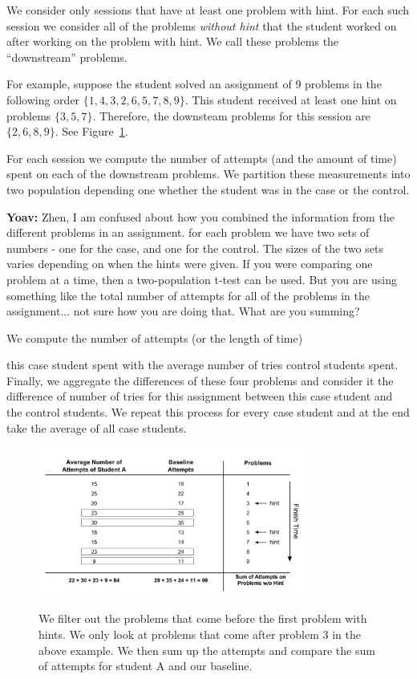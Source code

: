 \documentclass{llncs}
\begin{document}
We consider only sessions that have at least one problem with
hint. For each such session we consider all of the problems {\em
  without hint} that the student worked on after working on the
problem with hint. We call these problems the ``downstream'' problems.

For example, suppose the student solved an assignment of 9 problems in the
following order $\{ 1, 4, 3, 2, 6, 5, 7, 8, 9\}$. This student
received at least one hint on problems $\{3, 5, 7\}$. Therefore, the
downsteam problems for this session are $\{2, 6, 8, 9\}$. See
Figure~\ref{fig:pro_no_hint}.

For each session we compute the number of attempts (and the amount of
time) spent on each of the downstream problems. We partition these
measurements into two population depending one whether the student was
in the case or the control.

{\bf Yoav:} Zhen, I am confused about how you combined the information
from the different problems in an assignment. for each problem we have
two sets of numbers - one for the case, and one for the control. The
sizes of the two sets varies depending on when the hints were
given. If you were comparing one problem at a time, then a
two-population t-test can be used. But you are using something like
the total number of attempts for all of the problems in the
assignment... not sure how you are doing that. What are you summing?

We compute the number of attempts (or the length of time)

this case student spent with the
average number of tries control students spent. Finally, we aggregate
the differences of these four problems and consider it the difference
of number of tries for this assignment between this case student and
the control students. We repeat this process for every case student
and at the end take the average of all case students.

\begin{figure}[ht]
   \centering
   \caption{We filter out the problems that come before the first problem with hints. We only look at problems that come after problem 3 in the above example. We then sum up the attempts and compare the sum of attempts for student A and our baseline.}
   \includegraphics[width=0.8\textwidth]{image/Filter_problems.png}
   \label{fig:pro_no_hint}
\end{figure}
\end{document}
